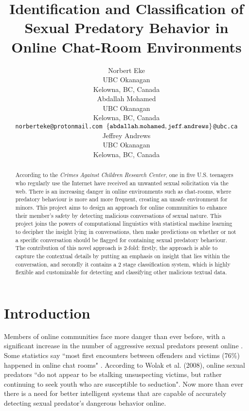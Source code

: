\documentclass[11pt]{article}
\title{Identification and Classification of Sexual Predatory Behavior in Online Chat-Room Environments}
\author{Norbert Eke \\
  UBC Okanagan \\
  Kelowna, BC, Canada \\
 \And
  Abdallah Mohamed \\
  UBC Okanagan \\
  Kelowna, BC, Canada \\
  {\tt norberteke@protonmail.com \tab  $\left\{\tt abdallah.mohamed, jeff.andrews \right\}$\tt @ubc.ca} \\
  \And
  Jeffrey Andrews \\
  UBC Okanagan \\
  Kelowna, BC, Canada \\
 }
\date{}
\begin{document}
\maketitle

\begin{abstract} According to the \textit{Crimes Against Children Research Center}, one in five U.S. teenagers who regularly use the Internet have received an unwanted sexual solicitation via the web. There is an increasing danger in online environments such as chat-rooms, where predatory behaviour is more and more frequent, creating an unsafe environment for minors. 
This project aims to design an approach for online communities to enhance their member's safety by detecting malicious conversations of sexual nature. This project joins the powers of computational linguistics with statistical machine learning to decipher the insight lying in conversations, then make predictions on whether or not a specific conversation should be flagged for containing sexual predatory behaviour. 
The contribution of this novel approach is 2-fold: firstly, the approach is able to capture the contextual details by putting an emphasis on insight that lies within the conversation, and secondly it contains a 2 stage classification system, which is highly flexible and customizable for detecting and classifying other malicious textual data. 
\end{abstract}

\section{Introduction}
Members of online communities face more danger than ever before, with a significant increase in the number of aggressive sexual predators present online \cite{wolak2008online}. Some statistics say ``most first encounters between offenders and victims (76\%) happened in online chat rooms" \cite{wolak2004internet}. According to Wolak et al. (2008), online sexual predators ``do not appear to be stalking unsuspecting victims, but rather continuing to seek youth who are susceptible to seduction". Now more than ever there is a need for better intelligent systems that are capable of accurately detecting sexual predator's dangerous behavior online.
\end{document}

